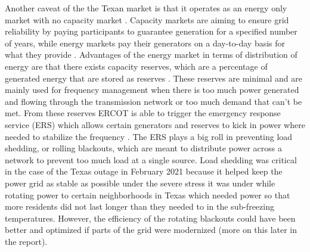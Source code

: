 \documentclass[12pt]{article}
\begin{document}
\indent %
Another caveat of the the Texan market is that it operates as an energy only market with no capacity market \cite{UtilDive}. Capacity markets are aiming to ensure grid reliability by paying participants to guarantee generation for a specified number of years, while energy markets pay their generators on a day-to-day basis for what they provide \cite{UtilDiveMarkets}. Advantages of the energy market in terms of distribution of energy are that there exists capacity reserves, which are a percentage of generated energy that are stored as reserves \cite{EOM}. These reserves are minimal and are mainly used for frequency management when there is too much power generated and flowing through the transmission network or too much demand that can't be met. From these reserves ERCOT is able to trigger the emergency response service (ERS) which allows certain generators and reserves to kick in power where needed to stabilize the frequency \cite{ERS}. The ERS plays a big roll in preventing load shedding, or rolling blackouts, which are meant to distribute power across a network to prevent too much load at a single source. Load shedding was critical in the case of the Texas outage in February 2021 because it helped keep the power grid as stable as possible under the severe stress it was under while rotating power to certain neighborhoods in Texas which needed power so that more residents did not last longer than they needed to in the sub-freezing temperatures. However, the efficiency of the rotating blackouts could have been better and optimized if parts of the grid were modernized (more on this later in the report). \par 
\end{document}
